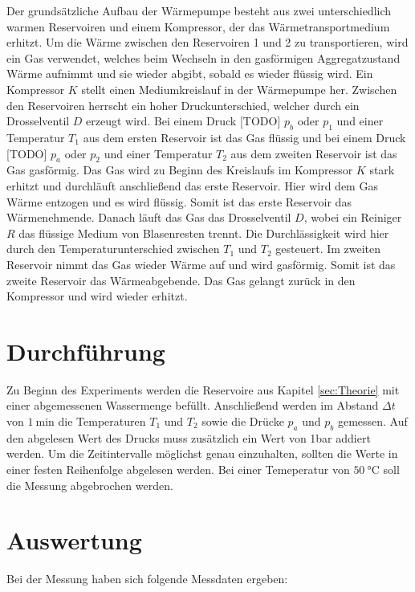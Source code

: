     Der grundsätzliche Aufbau der Wärmepumpe besteht aus zwei unterschiedlich warmen Reservoiren und einem Kompressor,
    der das Wärmetransportmedium erhitzt.
    Um die Wärme zwischen den Reservoiren 1 und 2 zu transportieren, wird ein Gas verwendet, welches beim Wechseln in den gasförmigen
    Aggregatzustand Wärme aufnimmt und sie wieder abgibt, sobald es wieder flüssig wird.
    Ein Kompressor $K$ stellt einen Mediumkreislauf in der Wärmepumpe her.
    Zwischen den Reservoiren herrscht ein hoher Druckunterschied, welcher durch ein Drosselventil $D$ erzeugt wird.
    Bei einem Druck [TODO] $p_b$ oder $p_1$ und einer Temperatur $T_1$ aus dem ersten Reservoir ist das Gas flüssig und bei einem Druck [TODO] $p_a$ oder $p_2$
    und einer Temperatur $T_2$ aus dem zweiten Reservoir ist das Gas gasförmig.
    Das Gas wird zu Beginn des Kreislaufs im Kompressor $K$ stark erhitzt und durchläuft anschließend das erste Reservoir.
    Hier wird dem Gas Wärme entzogen und es wird flüssig. Somit ist das erste Reservoir das Wärmenehmende.
    Danach läuft das Gas das Drosselventil $D$, wobei ein Reiniger $R$ das flüssige Medium von Blasenresten trennt.
    Die Durchlässigkeit wird hier durch den Temperaturunterschied zwischen $T_1$ und $T_2$ gesteuert.
    Im zweiten Reservoir nimmt das Gas wieder Wärme auf und wird gasförmig. Somit ist das zweite Reservoir das Wärmeabgebende.
    Das Gas gelangt zurück in den Kompressor und wird wieder erhitzt.


\section{Durchführung} \label{sec:Durchführung}
    Zu Beginn des Experiments werden die Reservoire aus Kapitel \ref{sec:Theorie} mit einer abgemessenen Wassermenge befüllt.
    Anschließend werden im Abstand $\Delta t$ von $\SI{1}{\minute}$ die Temperaturen $T_1$ und $T_2$ sowie die Drücke $p_a$ und $p_b$ gemessen.
    Auf den abgelesen Wert des Drucks muss zusätzlich ein Wert von 1bar addiert werden.
    Um die Zeitintervalle möglichst genau einzuhalten, sollten die Werte in einer festen Reihenfolge abgelesen werden.
    Bei einer Temeperatur von $\SI{50}{\celsius}$ soll die Messung abgebrochen werden.

\section{Auswertung} \label{sec:Auswertung}
    Bei der Messung haben sich folgende Messdaten ergeben:
    


